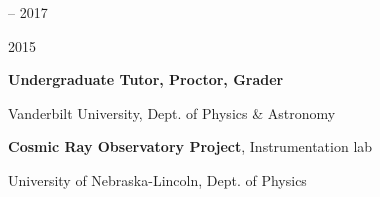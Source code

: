 \documentclass[cv.tex]{subfiles}
\begin{document}
\parbox{0.18\textwidth}{%
	 -- 2017 \par
	\null \par
	2015 \par
	\null \par
}
\hspace{1mm}
\parbox{0.8\textwidth}{%
	\vspace{1mm}
	\textbf{Undergraduate Tutor, Proctor, Grader} \par
	Vanderbilt University, Dept. of Physics \& Astronomy \par
	\textbf{Cosmic Ray Observatory Project}, Instrumentation lab \par
	University of Nebraska-Lincoln, Dept. of Physics \par
}
\end{document}
